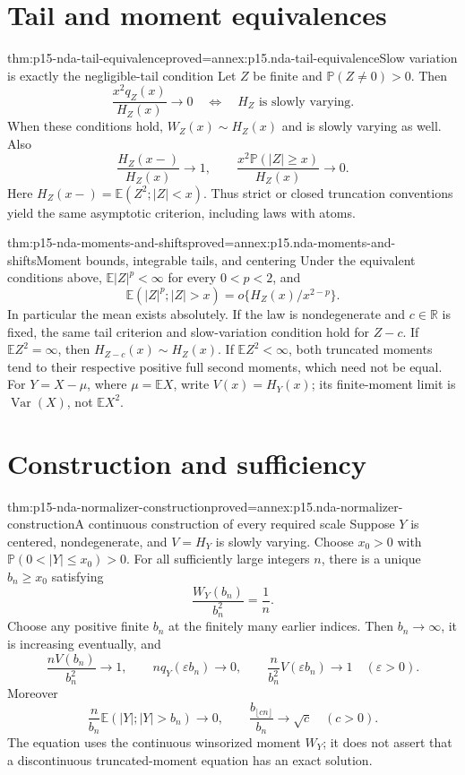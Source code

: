 \section{Tail and moment equivalences}
\label{sec:p15-nda-tail-calculus}

\begin{hbtheorem}{thm:p15-nda-tail-equivalence}{proved=annex:p15.nda-tail-equivalence}{Slow variation is exactly the negligible-tail condition}
Let \(Z\) be finite and \(\mathbb P(Z\ne0)>0\). Then
\[
 \frac{x^2q_Z(x)}{H_Z(x)}\longrightarrow0
       \quad\Longleftrightarrow\quad H_Z\text{ is slowly varying}.
 \]
When these conditions hold, \(W_Z(x)\sim H_Z(x)\) and is
slowly varying as well. Also
\[
 \frac{H_Z(x-)}{H_Z(x)}\to1,\qquad
 \frac{x^2\mathbb P(|Z|\geq x)}{H_Z(x)}\to0.
 \]
Here \(H_Z(x-)=\mathbb E(Z^2;|Z|<x)\).
Thus strict or closed truncation conventions yield the same
asymptotic criterion, including laws with atoms.
\end{hbtheorem}

\begin{hbtheorem}{thm:p15-nda-moments-and-shifts}{proved=annex:p15.nda-moments-and-shifts}{Moment bounds, integrable tails, and centering}
Under the equivalent conditions above, \(\mathbb E|Z|^p<\infty\)
for every \(0<p<2\), and
\[
 \mathbb E(|Z|^p;|Z|>x)
                    =o\{H_Z(x)/x^{2-p}\}.
 \]
In particular the mean exists absolutely.
If the law is nondegenerate and \(c\in\mathbb R\) is fixed,
the same tail criterion and slow-variation condition hold for \(Z-c\).
If \(\mathbb EZ^2=\infty\), then
\(H_{Z-c}(x)\sim H_Z(x)\).
If \(\mathbb EZ^2<\infty\), both truncated moments tend to
their respective positive full second moments, which need not be equal.
For \(Y=X-\mu\), where \(\mu=\mathbb EX\),
write \(V(x)=H_Y(x)\); its finite-moment limit is
\(\operatorname{Var}(X)\), not \(\mathbb EX^2\).
\end{hbtheorem}

\section{Construction and sufficiency}
\label{sec:p15-nda-sufficiency}

\begin{hbtheorem}{thm:p15-nda-normalizer-construction}{proved=annex:p15.nda-normalizer-construction}{A continuous construction of every required scale}
Suppose \(Y\) is centered, nondegenerate, and \(V=H_Y\) is
slowly varying. Choose \(x_0>0\) with
\(\mathbb P(0<|Y|\leq x_0)>0\).
For all sufficiently large integers \(n\), there is a unique
\(b_n\geq x_0\) satisfying
\[
 \frac{W_Y(b_n)}{b_n^2}=\frac1n.
 \]
Choose any positive finite \(b_n\) at the finitely many earlier
indices. Then \(b_n\to\infty\), it is increasing eventually, and
\[
 \frac{nV(b_n)}{b_n^2}\to1,\qquad
 n q_Y(\varepsilon b_n)\to0,\qquad
 \frac{n}{b_n^2}V(\varepsilon b_n)\to1
                                  \quad(\varepsilon>0).
 \]
Moreover
\[
 \frac{n}{b_n}\mathbb E(|Y|;|Y|>b_n)\to0,\qquad
 \frac{b_{\lfloor cn\rfloor}}{b_n}\to\sqrt c\quad(c>0).
 \]
The equation uses the continuous winsorized moment \(W_Y\);
it does not assert that a discontinuous truncated-moment equation
has an exact solution.
\end{hbtheorem}

